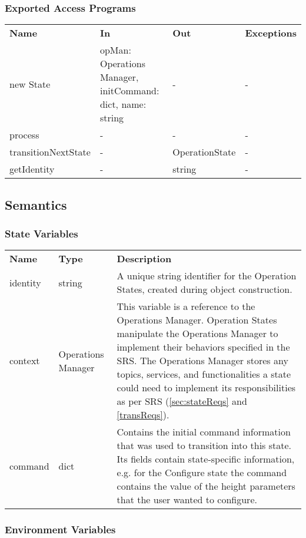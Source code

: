 \documentclass[12pt, titlepage]{article}
\begin{document}
\subsubsection{Exported Access Programs}
\begin{center}
\begin{tabular}{p{3.5cm} p{2.5cm} p{2.5cm} p{5cm}}
\hline
\textbf{Name} & \textbf{In} & \textbf{Out} & \textbf{Exceptions} \\
new State & opMan: Operations Manager, 
initCommand: dict, name: string & - & - \\
process & - & - & - \\
transitionNextState & - & OperationState & - \\
getIdentity & - & string & - \\
\hline
\hline
\end{tabular}
\end{center}
\subsection{Semantics}
\subsubsection{State Variables}
\begin{center}
\begin{tabular}{p{3 cm} p{4cm} p{5cm} }
\hline
\textbf{Name} & \textbf{Type} & \textbf{Description}  \\
identity & string & A unique string identifier for the Operation States, created during object construction. \\
context & Operations Manager & This variable is a reference to the Operations Manager. Operation States manipulate the Operations Manager to implement their behaviors specified in the SRS. The Operations Manager stores any  topics, services, and functionalities a state could need to implement its responsibilities as per SRS (\ref{sec:stateReqs} and \ref{transReqs}). 
 \\
command & dict & Contains the initial command information that was used to transition into this state. Its fields contain state-specific information, e.g. for the Configure state the command contains the value of the height parameters that the user wanted to configure.  \\
\hline
\hline
\end{tabular}
\end{center}
\subsubsection{Environment Variables}
\end{document}
